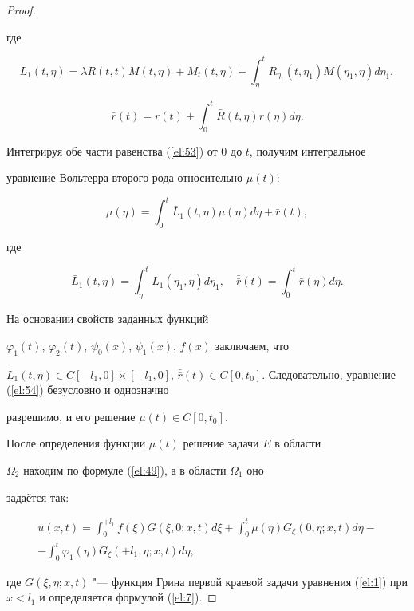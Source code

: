\begin{proof}
\begin{equation}
\end{equation}

где

$$

L_1(t,\eta)=\bar{\lambda}\bar{R}(t,t)\bar{M}(t,\eta)+\bar{M}_t(t,\eta)+\int_{\eta}^{t}\bar{R}_{\eta_1}(t,\eta_1)\bar{M}(\eta_1,\eta)d\eta_1,

$$

$$\bar{r}(t)=r(t)+\int_0^t\bar{R}(t,\eta)r(\eta)d\eta.$$



Интегрируя обе части равенства (\ref{el:53}) от $0$ до $t$, получим интегральное

уравнение Вольтерра второго рода относительно $\mu(t)$:

\begin{equation} \label{el:54}

\mu(\eta)=\int_0^t\bar{L}_1(t,\eta)\mu(\eta)d\eta+\bar{\bar{r}}(t),

\end{equation}

где

$$\bar{L}_1(t,\eta)=\int_{\eta}^tL_1(\eta_1,\eta)d\eta_1, \quad \bar{\bar{r}}(t)=\int_0^t\bar{r}(\eta)d\eta.$$



На основании свойств заданных функций

$\varphi_1(t)$, $\varphi_2(t)$, $\psi_0(x)$, $\psi_1(x)$, $f(x)$ заключаем, что

$\bar{L}_1(t,\eta)\in C[-l_1,0]\times[-l_1,0]$, $\bar{\bar{r}}(t)\in

C[0,t_0]$. Следовательно, уравнение (\ref{el:54}) безусловно и однозначно

разрешимо, и его решение $\mu(t)\in C[0,t_0]$.



После определения функции $\mu(t)$ решение задачи $E$ в области

$\Omega_2$ находим по формуле (\ref{el:49}), а в области $\Omega_1$ оно

задаётся так:

\begin{multline*}

u(x,t)=\int_0^{+l_1}f(\xi)G(\xi,0;x,t)d\xi+\int_0^t\mu(\eta)G_\xi(0,\eta;x,t)d\eta-\\

-\int_0^t\varphi_1(\eta)G_\xi(+l_1,\eta;x,t)d\eta,

\end{multline*}

где $G(\xi,\eta;x,t)$ "--- функция Грина первой краевой задачи уравнения (\ref{el:1}) при $x<l_1$ и определяется формулой (\ref{el:7}).

\end{proof}



